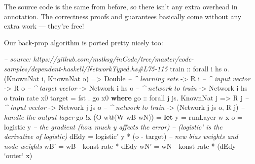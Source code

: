 \documentclass[]{article}
\newenvironment{Shaded}{}{}
\newcommand{\KeywordTok}[1]{\textcolor[rgb]{0.00,0.44,0.13}{\textbf{{#1}}}}
\newcommand{\DataTypeTok}[1]{\textcolor[rgb]{0.56,0.13,0.00}{{#1}}}
\newcommand{\CommentTok}[1]{\textcolor[rgb]{0.38,0.63,0.69}{\textit{{#1}}}}
\newcommand{\OtherTok}[1]{\textcolor[rgb]{0.00,0.44,0.13}{{#1}}}
\newcommand{\FunctionTok}[1]{\textcolor[rgb]{0.02,0.16,0.49}{{#1}}}
\newcommand{\NormalTok}[1]{{#1}}
\begin{document}
The source code is the same from before, so there isn't any extra overhead in
annotation. The correctness proofs and guarantees basically come without any
extra work --- they're free!

Our back-prop algorithm is ported pretty nicely too:

\begin{Shaded}
\begin{Highlighting}[]
\CommentTok{-- source: https://github.com/mstksg/inCode/tree/master/code-samples/dependent-haskell/NetworkTyped.hs#L75-115}
\OtherTok{train ::} \NormalTok{forall i hs o}\FunctionTok{.} \NormalTok{(}\DataTypeTok{KnownNat} \NormalTok{i, }\DataTypeTok{KnownNat} \NormalTok{o)}
      \OtherTok{=>} \DataTypeTok{Double}           \CommentTok{-- ^ learning rate}
      \OtherTok{->} \DataTypeTok{R} \NormalTok{i              }\CommentTok{-- ^ input vector}
      \OtherTok{->} \DataTypeTok{R} \NormalTok{o              }\CommentTok{-- ^ target vector}
      \OtherTok{->} \DataTypeTok{Network} \NormalTok{i hs o   }\CommentTok{-- ^ network to train}
      \OtherTok{->} \DataTypeTok{Network} \NormalTok{i hs o}
\NormalTok{train rate x0 target }\FunctionTok{=} \NormalTok{fst }\FunctionTok{.} \NormalTok{go x0}
  \KeywordTok{where}
\OtherTok{    go  ::} \NormalTok{forall j js}\FunctionTok{.} \DataTypeTok{KnownNat} \NormalTok{j}
        \OtherTok{=>} \DataTypeTok{R} \NormalTok{j              }\CommentTok{-- ^ input vector}
        \OtherTok{->} \DataTypeTok{Network} \NormalTok{j js o   }\CommentTok{-- ^ network to train}
        \OtherTok{->} \NormalTok{(}\DataTypeTok{Network} \NormalTok{j js o, }\DataTypeTok{R} \NormalTok{j)}
    \CommentTok{-- handle the output layer}
    \NormalTok{go }\FunctionTok{!}\NormalTok{x (}\DataTypeTok{O} \NormalTok{w}\FunctionTok{@}\NormalTok{(}\DataTypeTok{W} \NormalTok{wB wN))}
        \FunctionTok{=} \KeywordTok{let} \NormalTok{y    }\FunctionTok{=} \NormalTok{runLayer w x}
              \NormalTok{o    }\FunctionTok{=} \NormalTok{logistic y}
              \CommentTok{-- the gradient (how much y affects the error)}
              \CommentTok{--   (logistic' is the derivative of logistic)}
              \NormalTok{dEdy }\FunctionTok{=} \NormalTok{logistic' y }\FunctionTok{*} \NormalTok{(o }\FunctionTok{-} \NormalTok{target)}
              \CommentTok{-- new bias weights and node weights}
              \NormalTok{wB'  }\FunctionTok{=} \NormalTok{wB }\FunctionTok{-} \NormalTok{konst rate }\FunctionTok{*} \NormalTok{dEdy}
              \NormalTok{wN'  }\FunctionTok{=} \NormalTok{wN }\FunctionTok{-} \NormalTok{konst rate }\FunctionTok{*} \NormalTok{(dEdy }\OtherTok{`outer`} \NormalTok{x)}

\end{Highlighting}
\end{Shaded}
\end{document}
